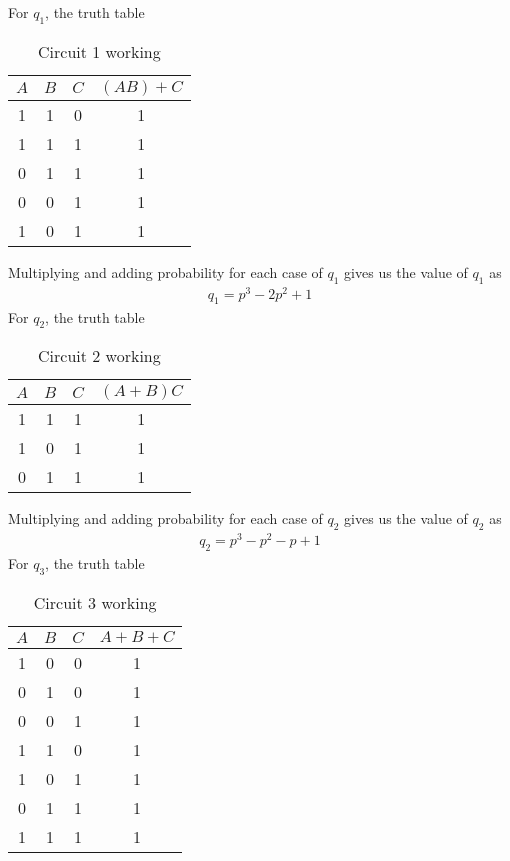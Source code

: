For $q_1$, the truth table
\begin{table}[h]
    \centering
    \begin{tabular}{|c|c|c|c|}
    \hline
         $A$ & $B$ & $C$ & $(AB) + C$ \\
         \hline
         1 &1  & 0 &1\\\hline
         1&1&1&1\\\hline
         0&1&1&1\\\hline
         0&0&1&1\\\hline
         1&0&1&1\\
    \hline
    \end{tabular}
    \caption{Circuit 1 working}
    \label{june2016-118:tab:my_label}
\end{table}
Multiplying and adding probability for each case of $q_1$ gives us the value of $q_1$ as
\begin{align}
    q_1 = p^3-2p^2+1
\end{align}
For $q_2$, the truth table
\begin{table}[h]
    \centering
    \begin{tabular}{|c|c|c|c|}
    \hline
         $A$ & $B$ & $C$ & $(A+B)C$ \\
         \hline
         1&1&1&1\\ \hline
         1&0&1&1\\\hline
         0&1&1&1\\
    \hline
    \end{tabular}
    \caption{Circuit 2 working}
    \label{june2016-118:tab:table2}
\end{table}
Multiplying and adding probability for each case of $q_2$ gives us the value of $q_2$ as
\begin{align}
    q_2 = p^3-p^2-p+1
\end{align}
For $q_3$, the truth table
\begin{table}[h]
    \centering
    \begin{tabular}{|c|c|c|c|}
    \hline
         $A$ & $B$ & $C$ & $A + B + C$ \\
         \hline
         1&0&0&1\\\hline
         0&1&0&1\\\hline
         0&0&1&1\\\hline
         1&1&0&1\\\hline
         1&0&1&1\\\hline
         0&1&1&1\\\hline
         1&1&1&1\\
    \hline
    \end{tabular}
    \caption{Circuit 3 working}
    \label{june2016-118:tab:table3}
\end{table}
